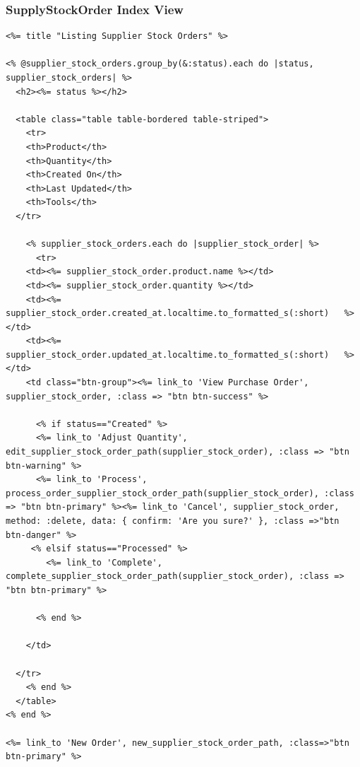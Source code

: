 \documentclass[a4paper]{article}
\begin{document}
\subsubsection{SupplyStockOrder Index View}
\begin{verbatim}
<%= title "Listing Supplier Stock Orders" %>

<% @supplier_stock_orders.group_by(&:status).each do |status, supplier_stock_orders| %>
  <h2><%= status %></h2>

  <table class="table table-bordered table-striped">
    <tr>
    <th>Product</th>
    <th>Quantity</th>
    <th>Created On</th>
    <th>Last Updated</th>
    <th>Tools</th>
  </tr>

    <% supplier_stock_orders.each do |supplier_stock_order| %>
      <tr>
    <td><%= supplier_stock_order.product.name %></td>
    <td><%= supplier_stock_order.quantity %></td>
    <td><%= supplier_stock_order.created_at.localtime.to_formatted_s(:short)   %></td>
    <td><%= supplier_stock_order.updated_at.localtime.to_formatted_s(:short)   %></td>
    <td class="btn-group"><%= link_to 'View Purchase Order', supplier_stock_order, :class => "btn btn-success" %>

      <% if status=="Created" %>
      <%= link_to 'Adjust Quantity', edit_supplier_stock_order_path(supplier_stock_order), :class => "btn btn-warning" %>
      <%= link_to 'Process', process_order_supplier_stock_order_path(supplier_stock_order), :class => "btn btn-primary" %><%= link_to 'Cancel', supplier_stock_order, method: :delete, data: { confirm: 'Are you sure?' }, :class =>"btn btn-danger" %>
     <% elsif status=="Processed" %>
        <%= link_to 'Complete', complete_supplier_stock_order_path(supplier_stock_order), :class => "btn btn-primary" %>

      <% end %>

    </td>

  </tr>
    <% end %>
  </table>
<% end %>

<%= link_to 'New Order', new_supplier_stock_order_path, :class=>"btn btn-primary" %>

\end{verbatim} 
\end{document}
